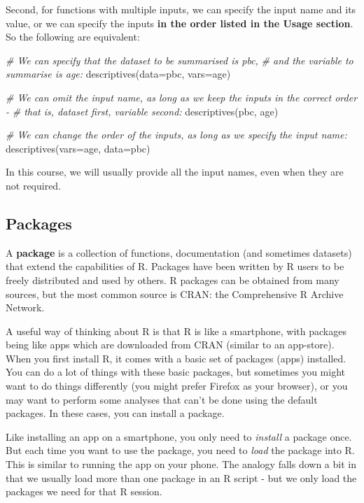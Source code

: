 \documentclass[
]{memoir}
\newenvironment{Shaded}{\begin{snugshade}}{\end{snugshade}}
\newcommand{\AttributeTok}[1]{\textcolor[rgb]{0.77,0.63,0.00}{#1}}
\newcommand{\CommentTok}[1]{\textcolor[rgb]{0.56,0.35,0.01}{\textit{#1}}}
\newcommand{\FunctionTok}[1]{\textcolor[rgb]{0.00,0.00,0.00}{#1}}
\newcommand{\NormalTok}[1]{#1}
\begin{document}
Second, for functions with multiple inputs, we can specify the input name and its value, or we can specify the inputs \textbf{in the order listed in the Usage section}. So the following are equivalent:

\begin{Shaded}
\begin{Highlighting}[]
\CommentTok{\# We can specify that the dataset to be summarised is pbc,}
\CommentTok{\#   and the variable to summarise is age:}
\FunctionTok{descriptives}\NormalTok{(}\AttributeTok{data=}\NormalTok{pbc, }\AttributeTok{vars=}\NormalTok{age)}

\CommentTok{\# We can omit the input name, as long as we keep the inputs in the correct order {-} }
\CommentTok{\#   that is, dataset first, variable second:}
\FunctionTok{descriptives}\NormalTok{(pbc, age)}

\CommentTok{\# We can change the order of the inputs, as long as we specify the input name:}
\FunctionTok{descriptives}\NormalTok{(}\AttributeTok{vars=}\NormalTok{age, }\AttributeTok{data=}\NormalTok{pbc)}
\end{Highlighting}
\end{Shaded}

In this course, we will usually provide all the input names, even when they are not required.

\hypertarget{packages}{%
\subsection{Packages}\label{packages}}

A \textbf{package} is a collection of functions, documentation (and sometimes datasets) that extend the capabilities of R. Packages have been written by R users to be freely distributed and used by others. R packages can be obtained from many sources, but the most common source is CRAN: the Comprehensive R Archive Network.

A useful way of thinking about R is that R is like a smartphone, with packages being like apps which are downloaded from CRAN (similar to an app-store). When you first install R, it comes with a basic set of packages (apps) installed. You can do a lot of things with these basic packages, but sometimes you might want to do things differently (you might prefer Firefox as your browser), or you may want to perform some analyses that can't be done using the default packages. In these cases, you can install a package.

Like installing an app on a smartphone, you only need to \emph{install} a package once. But each time you want to use the package, you need to \emph{load} the package into R. This is similar to running the app on your phone. The analogy falls down a bit in that we usually load more than one package in an R script - but we only load the packages we need for that R session.
\end{document}
